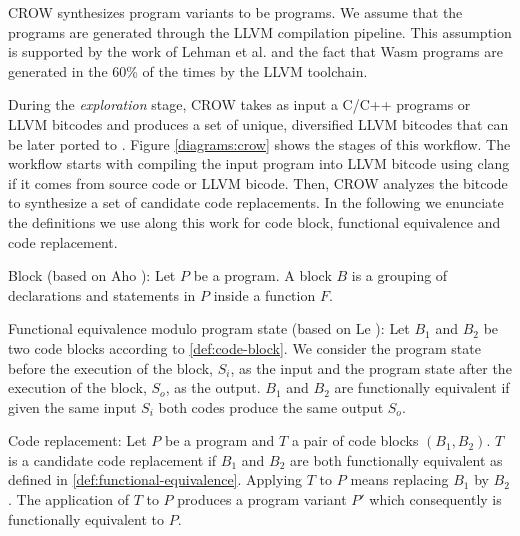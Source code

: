 
CROW synthesizes program variants to be \wasm programs. We assume that the programs are generated through the LLVM compilation pipeline. This assumption is supported by the work of Lehman et al. \cite{} and the fact that Wasm programs are generated in the 60\% of the times by the LLVM toolchain.

During the \emph{exploration} stage, CROW takes as input a C/C++ programs or LLVM bitcodes and produces a set of unique, diversified LLVM bitcodes that can be later ported to \wasm.
Figure \ref{diagrams:crow} shows the stages of this workflow. The workflow starts with compiling the input program into LLVM bitcode using clang if it comes from source code or LLVM bicode. Then, CROW analyzes the bitcode to synthesize a set of candidate code replacements. In the following we enunciate the definitions we use along this work for code block, functional equivalence and code replacement. 


\begin{definition}{Block (based on Aho \etal \cite{10.5555/6448}):}\label{def:code-block}
    Let $P$ be a program. A block $B$ is a grouping of declarations and statements in $P$ inside a function $F$. 
\end{definition}


\begin{definition}{Functional equivalence modulo program state (based on Le \etal \cite{10.1145/2594291.2594334}):}
    \label{def:functional-equivalence}
    Let $B_1$ and $B_2$ be two code blocks according to \autoref{def:code-block}. We consider the program state before the execution of the block, $S_i$, as the input and the program state after the execution of the block, $S_o$, as the output. $B_1$ and $B_2$ are functionally equivalent if given the same input $S_i$ both codes produce the same output $S_o$.
\end{definition}

\begin{definition}{Code replacement:}
    \label{def:code-replacement}
    Let $P$ be a program and $T$ a pair of code blocks $(B_1, B_2)$. $T$ is a candidate code replacement if $B_1$ and $B_2$ are both functionally equivalent as defined in \autoref{def:functional-equivalence}.
    Applying $T$ to $P$ means replacing $B_1$ by $B_2$. The application of $T$ to $P$ produces a program variant $P'$ which consequently is functionally equivalent to $P$.     
\end{definition}

